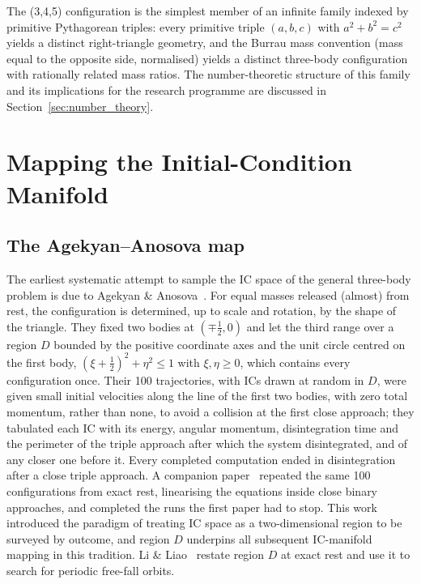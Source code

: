 \documentclass[11pt,a4paper]{article}
\begin{document}
The (3,4,5) configuration is the simplest member of an infinite family indexed by primitive
Pythagorean triples: every primitive triple $(a,b,c)$ with $a^2+b^2=c^2$ yields a distinct
right-triangle geometry, and the Burrau mass convention (mass equal to the opposite side,
normalised) yields a distinct three-body configuration with rationally related mass ratios.
The number-theoretic structure of this family and its implications for the research programme
are discussed in Section~\ref{sec:number_theory}.

\section{Mapping the Initial-Condition Manifold}

\subsection{The Agekyan--Anosova map}

The earliest systematic attempt to sample the IC space of the general three-body problem is due
to Agekyan \& Anosova~\cite{agekian1967}.  For equal masses released (almost) from rest, the
configuration is determined, up to scale and rotation, by the shape of the triangle.  They fixed
two bodies at $(\mp\tfrac12, 0)$ and let the third range over a region $D$ bounded by the
positive coordinate axes and the unit circle centred on the first body,
$(\xi+\tfrac12)^2+\eta^2 \le 1$ with $\xi,\eta \ge 0$, which contains every configuration once.
Their 100 trajectories, with ICs drawn at random in $D$, were given small initial velocities
along the line of the first two bodies, with zero total momentum, rather than none, to avoid a
collision at the first close approach; they
tabulated each IC with its energy, angular momentum, disintegration time and the perimeter of the
triple approach after which the system disintegrated, and of any closer one before it.  Every
completed computation ended in disintegration after a close triple approach.  A companion
paper~\cite{agekian1968b} repeated the same 100 configurations from exact rest, linearising the
equations inside close binary approaches, and completed the runs the first paper had to stop.
This work introduced the paradigm of treating IC space as a
two-dimensional region to be surveyed by outcome, and region $D$ underpins all subsequent
IC-manifold mapping in this tradition.  Li \& Liao~\cite{li2018} restate region $D$ at exact
rest and use it to search for periodic free-fall orbits.
\end{document}

